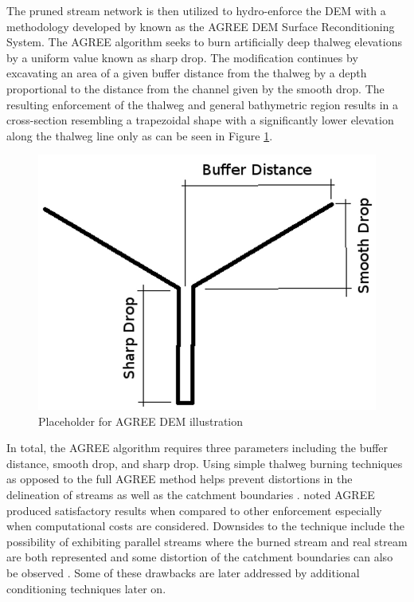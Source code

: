 The pruned stream network is then utilized to hydro-enforce the DEM with a methodology developed by  known as the AGREE DEM Surface Reconditioning System. 
The AGREE algorithm seeks to burn artificially deep thalweg elevations by a uniform value known as sharp drop. 
The modification continues by excavating an area of a given buffer distance from the thalweg by a depth proportional to the distance from the channel given by the smooth drop. 
The resulting enforcement of the thalweg and general bathymetric region results in a cross-section resembling a trapezoidal shape with a significantly lower elevation along the thalweg line only as can be seen in Figure \ref{fig:agree_dem_cross_section}.
%
\begin{figure}[h!]
\centering
\includegraphics[scale=1.0]{figures/agree_dem_cross_section.jpg}
\caption{Placeholder for AGREE DEM illustration}
\label{fig:agree_dem_cross_section}
\end{figure}
%
In total, the AGREE algorithm requires three parameters including the buffer distance, smooth drop, and sharp drop. 
Using simple thalweg burning techniques as opposed to the full AGREE method helps prevent distortions in the delineation of streams as well as the catchment boundaries \cite{saunders1995grid,saunders1996gis,mizgalewicz1996modeling,hellweger1997agree,quenzer1998gis,baker2006comparison}.
 noted AGREE produced satisfactory results when compared to other enforcement especially when computational costs are considered. 
Downsides to the technique include the possibility of exhibiting parallel streams where the burned stream and real stream are both represented \cite{hellweger1997agree,saunders1999preparation} and some distortion of the catchment boundaries can also be observed \cite{saunders1999preparation,saunders1996gis}. Some of these drawbacks are later addressed by additional conditioning techniques later on.
%
